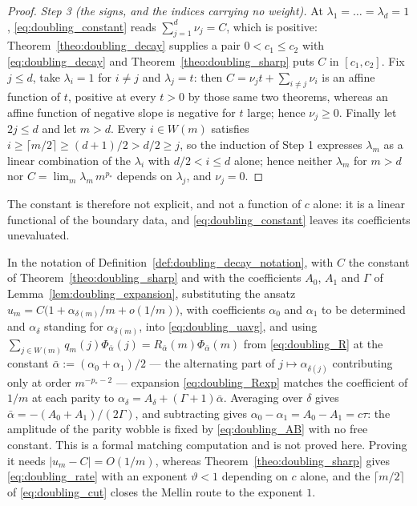 \begin{proof}
\emph{Step 3 (the signs, and the indices carrying no weight).} At
$\lambda_1=\dots=\lambda_d=1$, \eqref{eq:doubling_constant} reads $\sum_{j=1}^{d}\nu_j=C$,
which is positive: Theorem~\ref{theo:doubling_decay} supplies a pair $0<c_1\leq c_2$ with
\eqref{eq:doubling_decay} and Theorem~\ref{theo:doubling_sharp} puts $C$ in $[c_1,c_2]$. Fix
$j\leq d$, take $\lambda_i=1$ for $i\neq j$ and $\lambda_j=t$: then
$C=\nu_jt+\sum_{i\neq j}\nu_i$ is an affine function of $t$, positive at every $t>0$ by those
same two theorems, whereas an affine function of negative slope is
negative for $t$ large; hence $\nu_j\geq0$. Finally let $2j\leq d$ and let $m>d$. Every
$i\in W(m)$ satisfies $i\geq\lceil m/2\rceil\geq(d+1)/2>d/2\geq j$, so the induction of Step 1
expresses $\lambda_m$ as a linear combination of the $\lambda_i$ with $d/2<i\leq d$ alone;
hence neither $\lambda_m$ for $m>d$ nor $C=\lim_m\lambda_m\,m^{p_*}$ depends on $\lambda_j$,
and $\nu_j=0$.
\end{proof}

The constant is therefore not explicit, and not a function of $c$ alone: it is a linear
functional of the boundary data, and \eqref{eq:doubling_constant} leaves its coefficients
unevaluated.

\begin{remark}\label{rem:doubling_second_order}
In the notation of Definition~\ref{def:doubling_decay_notation}, with $C$ the constant of
Theorem~\ref{theo:doubling_sharp} and with the coefficients $A_0$, $A_1$ and $\Gamma$ of
Lemma~\ref{lem:doubling_expansion}, substituting the ansatz
$u_m=C\bigl(1+\alpha_{\delta(m)}/m+o(1/m)\bigr)$, with coefficients $\alpha_0$ and $\alpha_1$
to be determined and $\alpha_\delta$ standing for $\alpha_{\delta(m)}$, into
\eqref{eq:doubling_uavg}, and using $\sum_{j\in W(m)}q_m(j)\Phi_{\bar\alpha}(j)=R_{\bar\alpha}(m)\Phi_{\bar\alpha}(m)$ from
\eqref{eq:doubling_R} at the constant $\bar\alpha:=(\alpha_0+\alpha_1)/2$ --- the alternating
part of $j\mapsto\alpha_{\delta(j)}$ contributing only at order $m^{-p_*-2}$ --- expansion
\eqref{eq:doubling_Rexp} matches the coefficient of $1/m$ at each parity to $\alpha_\delta=A_\delta+(\Gamma+1)\bar\alpha$. Averaging over $\delta$ gives
$\bar\alpha=-(A_0+A_1)/(2\Gamma)$, and subtracting gives $\alpha_0-\alpha_1=A_0-A_1=c\tau$: the
amplitude of the parity wobble is fixed by \eqref{eq:doubling_AB} with no free constant. This
is a formal matching computation and is not proved here. Proving it needs $|u_m-C|=O(1/m)$,
whereas Theorem~\ref{theo:doubling_sharp} gives \eqref{eq:doubling_rate} with an exponent
$\vartheta<1$ depending on $c$ alone, and the $\lceil m/2\rceil$ of \eqref{eq:doubling_cut}
closes the Mellin route to the exponent $1$.
\end{remark}

